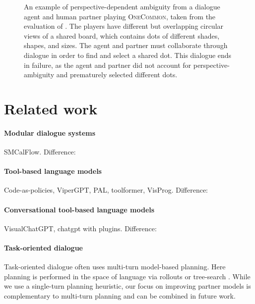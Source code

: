 \documentclass[11pt]{article}
\begin{document}
\begin{figure}[t]
\vspace{1em}

\caption{
An example of perspective-dependent ambiguity from a dialogue {\color{blue}agent} and human {\color{red}partner} playing \textsc{OneCommon}, taken from the evaluation of \citet{fried}.
The players have different but overlapping circular views of a shared board,
which contains dots of different shades, shapes, and sizes.
The agent and partner must collaborate through dialogue in order to find and
select a shared dot.
This dialogue ends in failure, as the agent and partner did not account for perspective-ambiguity and prematurely selected different dots.
}
\label{fig:oc}
\end{figure}


\section{Related work}

\paragraph{Modular dialogue systems}
SMCalFlow.
Difference:

\paragraph{Tool-based language models}
Code-as-policies, ViperGPT, PAL, toolformer, VisProg.
Difference: 

\paragraph{Conversational tool-based language models}
VisualChatGPT, chatgpt with plugins.
Difference:


\paragraph{Task-oriented dialogue}
Task-oriented dialogue often uses multi-turn model-based planning.
Here planning is performed in the space of language via rollouts or tree-search
\citep{dnd,yarats2017rollout,ingress,jang2020bapomdp}.
While we use a single-turn planning heuristic,
our focus on improving partner models is complementary to multi-turn planning and can be combined in future work.
\end{document}
